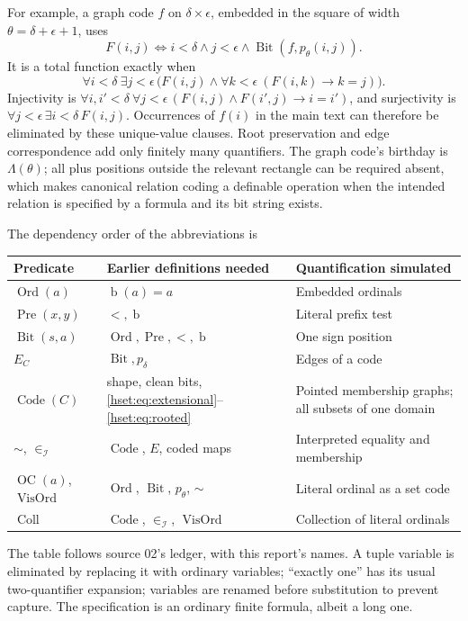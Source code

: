 \documentclass[11pt,letterpaper]{article}
\theoremstyle{definition}
\theoremstyle{remark}
\newcommand{\Ord}{\operatorname{Ord}}
\newcommand{\bd}{\operatorname{b}}
\newcommand{\I}{\mathcal I}
\newcommand{\Code}{\operatorname{Code}}
\newcommand{\Bit}{\operatorname{Bit}}
\newcommand{\Pre}{\operatorname{Pre}}
\newcommand{\Vis}{\operatorname{VisOrd}}
\newcommand{\Coll}{\operatorname{Coll}}
\newcommand{\OC}{\operatorname{OC}}
\begin{document}
For example, a graph code $f$ on $\delta\times\epsilon$, embedded in the square
of width $\theta=\delta+\epsilon+1$, uses
\[
 F(i,j)\iff i<\delta\land j<\epsilon\land\Bit(f,p_\theta(i,j)).
\]
It is a total function exactly when
\[
 \forall i<\delta\ \exists j<\epsilon\,
 \bigl(F(i,j)\land\forall k<\epsilon\ (F(i,k)\longrightarrow k=j)\bigr).
\]
Injectivity is
$\forall i,i'<\delta\ \forall j<\epsilon\,(F(i,j)\land F(i',j)\to i=i')$,
and surjectivity is $\forall j<\epsilon\,\exists i<\delta\,F(i,j)$.
Occurrences of $f(i)$ in the main text can therefore be eliminated by these
unique-value clauses. Root preservation and edge correspondence add only
finitely many quantifiers. The graph code's birthday is $\Lambda(\theta)$; all
plus positions outside the relevant rectangle can be required absent, which
makes canonical relation coding a definable operation when the intended relation
is specified by a formula and its bit string exists.

The dependency order of the abbreviations is
\begin{center}\small
\begin{tabular}{@{}P{0.2\textwidth}P{0.36\textwidth}P{0.34\textwidth}@{}}
\toprule
Predicate & Earlier definitions needed & Quantification simulated\\
\midrule
$\Ord(a)$ & $\bd(a)=a$ & Embedded ordinals\\
$\Pre(x,y)$ & $<,\bd$ & Literal prefix test\\
$\Bit(s,a)$ & $\Ord,\Pre,<,\bd$ & One sign position\\
$E_C$ & $\Bit,p_\delta$ & Edges of a code\\
$\Code(C)$ & shape, clean bits, \eqref{hset:eq:extensional}--\eqref{hset:eq:rooted} & Pointed membership graphs; all subsets of one domain\\
$\sim$, $\in_\I$ & $\Code$, $E$, coded maps & Interpreted equality and membership\\
$\OC(a)$, $\Vis$ & $\Ord$, $\Bit$, $p_\theta$, $\sim$ & Literal ordinal as a set code\\
$\Coll$ & $\Code$, $\in_\I$, $\Vis$ & Collection of literal ordinals\\
\bottomrule
\end{tabular}
\end{center}
The table follows source 02's ledger, with this report's names. A tuple variable
is eliminated by replacing it with ordinary variables; ``exactly one'' has its
usual two-quantifier expansion; variables are renamed before substitution to
prevent capture. The specification is an ordinary finite formula, albeit a long
one.
\end{document}
